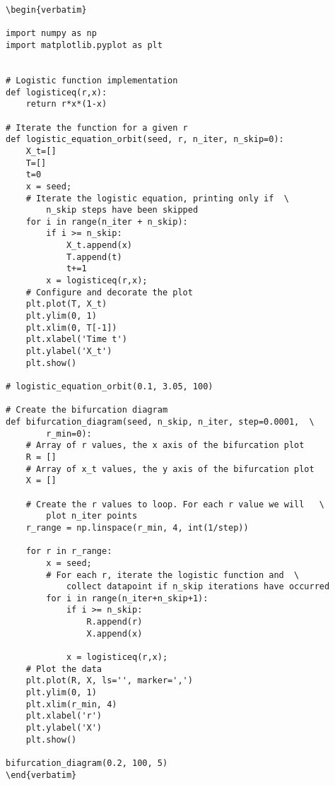 \begin{lstlisting}
\begin{verbatim}

import numpy as np
import matplotlib.pyplot as plt


# Logistic function implementation
def logisticeq(r,x):
    return r*x*(1-x)

# Iterate the function for a given r
def logistic_equation_orbit(seed, r, n_iter, n_skip=0):
    X_t=[]
    T=[]
    t=0
    x = seed;
    # Iterate the logistic equation, printing only if  \
        n_skip steps have been skipped
    for i in range(n_iter + n_skip):
        if i >= n_skip:
            X_t.append(x)
            T.append(t)
            t+=1
        x = logisticeq(r,x);
    # Configure and decorate the plot
    plt.plot(T, X_t)
    plt.ylim(0, 1)
    plt.xlim(0, T[-1])
    plt.xlabel('Time t')
    plt.ylabel('X_t')
    plt.show()

# logistic_equation_orbit(0.1, 3.05, 100)

# Create the bifurcation diagram
def bifurcation_diagram(seed, n_skip, n_iter, step=0.0001,  \ 
        r_min=0):
    # Array of r values, the x axis of the bifurcation plot
    R = []
    # Array of x_t values, the y axis of the bifurcation plot
    X = []
    
    # Create the r values to loop. For each r value we will   \ 
        plot n_iter points
    r_range = np.linspace(r_min, 4, int(1/step))

    for r in r_range:
        x = seed;
        # For each r, iterate the logistic function and  \  
            collect datapoint if n_skip iterations have occurred
        for i in range(n_iter+n_skip+1):
            if i >= n_skip:
                R.append(r)
                X.append(x)
                
            x = logisticeq(r,x);
    # Plot the data    
    plt.plot(R, X, ls='', marker=',')
    plt.ylim(0, 1)
    plt.xlim(r_min, 4)
    plt.xlabel('r')
    plt.ylabel('X')
    plt.show()

bifurcation_diagram(0.2, 100, 5)
\end{verbatim}
\end{lstlisting}
